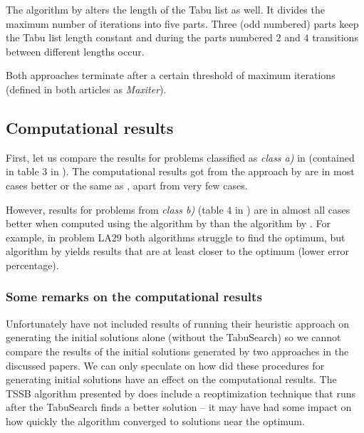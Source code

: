 \documentclass[14pt]{article}
\begin{document}
The algorithm by \citet{pezzella} alters the length of the Tabu list as well. It divides the maximum number of iterations into five parts. Three (odd numbered) parts keep the Tabu list length constant and during the parts numbered $2$ and $4$ transitions between different lengths occur.

Both approaches terminate after a certain threshold of maximum iterations (defined in both articles as \textit{Maxiter}).

\subsection{Computational results}

First, let us compare the results for problems classified as \textit{class a)} in \cite{pezzella} (contained in table 3 in \cite{amico-trubian}). The computational results got from the approach by \citet{pezzella} are in most cases better or the same as \citet{amico-trubian}, apart from very few cases.

However, results for problems from \textit{class b)} (table 4 in \cite{amico-trubian}) are in almost all cases better when computed using the algorithm by \citet{pezzella} than the algorithm by \citet{amico-trubian}. For example, in problem LA29 both algorithms struggle to find the optimum, but algorithm by \citet{pezzella} yields results that are at least closer to the optimum (lower error percentage).

\subsubsection{Some remarks on the computational results}

Unfortunately \citet{pezzella} have not included results of running their heuristic approach on generating the initial solutions alone (without the TabuSearch) so we cannot compare the results of the initial solutions generated by two approaches in the discussed papers. We can only speculate on how did these procedures for generating initial solutions have an effect on the computational results. The TSSB algorithm presented by \citet{pezzella} does include a reoptimization technique that runs after the TabuSearch finds a better solution – it may have had some impact on how quickly the algorithm converged to solutions near the optimum.



\end{document}
